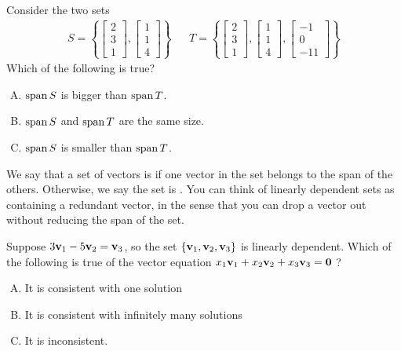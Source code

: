 


\begin{applicationActivities}

\begin{activity}{10}
  Consider the two sets
  \begin{align*}
    S=\left\{
  \begin{bmatrix}2\\3\\1\end{bmatrix},
  \begin{bmatrix}1\\1\\4\end{bmatrix}
  \right\} & & 
    T=\left\{
  \begin{bmatrix}2\\3\\1\end{bmatrix},
  \begin{bmatrix}1\\1\\4\end{bmatrix}, 
  \begin{bmatrix}-1\\0\\-11\end{bmatrix}
  \right\} 
  \end{align*}
  Which of the following is true?

	\begin{enumerate}[(A)]
	\item \(\operatorname{span} S\) is bigger than \(\operatorname{span} T\).
	\item \(\operatorname{span} S\) and \(\operatorname{span} T\) are the same size.
	\item \(\operatorname{span} S\) is smaller than \(\operatorname{span} T\).
	\end{enumerate}
	
\end{activity}

\begin{definition}
  We say that a set of vectors is  if one vector
  in the set belongs to the span of the others. Otherwise, we say the set
  is .
  \vspace{1em}
  You can think of linearly dependent sets as containing a redundant vector,
  in the sense that you can drop a vector out without reducing the span of the set.
\end{definition}

\begin{activity}{10}
  Suppose \(3\mathbf v_1-5\mathbf v_2=\mathbf v_3\), so the set
  \(\{\mathbf v_1,\mathbf v_2,\mathbf v_3\}\) is linearly dependent.
  Which of the following is true of the vector equation \(x_1\mathbf v_1+x_2\mathbf v_2+x_3\mathbf v_3=\mathbf 0\) ?
  \begin{enumerate}[(A)]
  \item It is consistent with one solution
  \item It is consistent with infinitely many solutions
  \item It is inconsistent.
  \end{enumerate}
\end{activity}


\end{applicationActivities}
